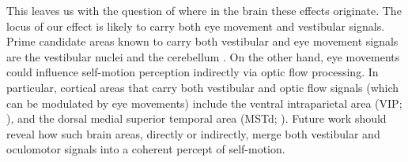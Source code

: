 This leaves us with the question of where in the brain these effects originate. The locus of our effect is likely to carry both eye movement and vestibular signals. Prime candidate areas known to carry both vestibular and eye movement signals are the vestibular nuclei \cite{henn1974,daunton1979} and the cerebellum \cite{waespe1981}. On the other hand, eye movements could influence self-motion perception indirectly via optic flow processing. In particular, cortical areas that carry both vestibular and optic flow signals (which can be modulated by eye movements) include the ventral intraparietal area (VIP; ), and the dorsal medial superior temporal area (MSTd; ). Future work should reveal how such brain areas, directly or indirectly, merge both vestibular and oculomotor signals into a coherent percept of self-motion.

